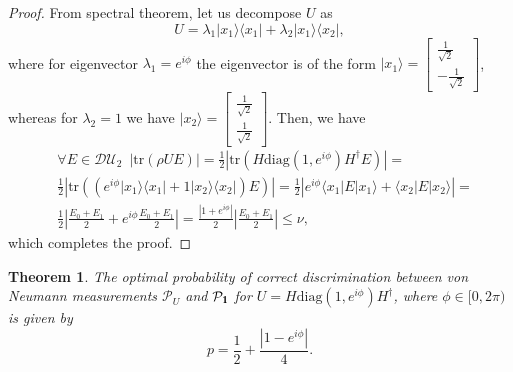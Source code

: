 \documentclass[preprint,12pt, a4paper]{elsarticle}
\newcommand{\ket}[1]{\ensuremath{|#1\rangle}}
\newcommand{\bra}[1]{\ensuremath{\langle#1|}}
\newcommand{\ketbra}[2]{\ensuremath{\ket{#1}\bra{#2}}}
\newcommand{\proj}[1]{\ensuremath{\ketbra{#1}{#1}}}
\newcommand{\1}{{\rm 1\hspace{-0.9mm}l}}
\newcommand{\Id}{{\rm 1\hspace{-0.9mm}l}}
\newcommand{\PP}{\mathcal{P}}
\newcommand{\diaguni}{\ensuremath{\mathcal{DU}}}
\newcommand{\diag}{\mathrm{diag}}
\newcommand{\tr}{\mathrm{tr}}
\newtheorem{theorem}{Theorem}
\begin{document}
\begin{proof}
	From spectral theorem, let us decompose $U$ as
	\begin{equation}
	U= \lambda_1 \ketbra{x_1}{x_1} + \lambda_2 \ketbra{x_1}{x_2}, 
	\end{equation}
	where  for eigenvector $\lambda_1 = e^{i \phi}$ the eigenvector is 
	of the form $\ket{x_1} = 
	\left[\begin{array}{c}\frac{1}{\sqrt{2}}\\-\frac{1}{\sqrt{2}}\end{array}\right]$,
	whereas for  $\lambda_2 = 1$ we have $\ket{x_2} = 
	\left[\begin{array}{c}\frac{1}{\sqrt{2}}\\\frac{1}{\sqrt{2}}\end{array}\right]$.
	Then, we have 
	\begin{equation}
	\begin{split}
	& \forall E \in \diaguni_2 \,\,\, | \tr (\rho U E) | = \frac{1}{2}  \left| \tr \left(
	H \diag(1, e^{i\phi}) H^\dagger E \right) \right| =  \\ &
	\frac{1}{2} \left| \tr\left((  e^{i \phi} \proj{x_1} + 1 \proj{x_2} ) E \right) 
	\right|  = 
	\frac{1}{2} \left| e^{i \phi}  \bra{x_1} E \ket{x_1} + \bra{x_2} E \ket{x_2} 
	\right| = \\& 
	\frac{1}{2} \left| \frac{E_0 + E_1}{2} + e^{i \phi } \frac{E_0+E_1}{2} \right| 
	= 
	\frac{\left| 1+ e^{i \phi } \right|}{2} \left| \frac{E_0 + E_1}{2} \right| \le 
	\nu, 
	\end{split}
	\end{equation}
	which completes the proof.
\end{proof}
\begin{theorem}
The optimal probability of correct discrimination between von Neumann
measurements $\PP_U$ and $\PP_{\Id}$ for $U = H \diag(1, e^{i \phi}) H^\dagger$,
where $\phi \in [0, 2\pi)$ is given by
\begin{equation}
p = \frac{1}{2} + \frac{|1 - e^{i \phi}  |}{4} . 
\end{equation}
\end{theorem}
\end{document}
